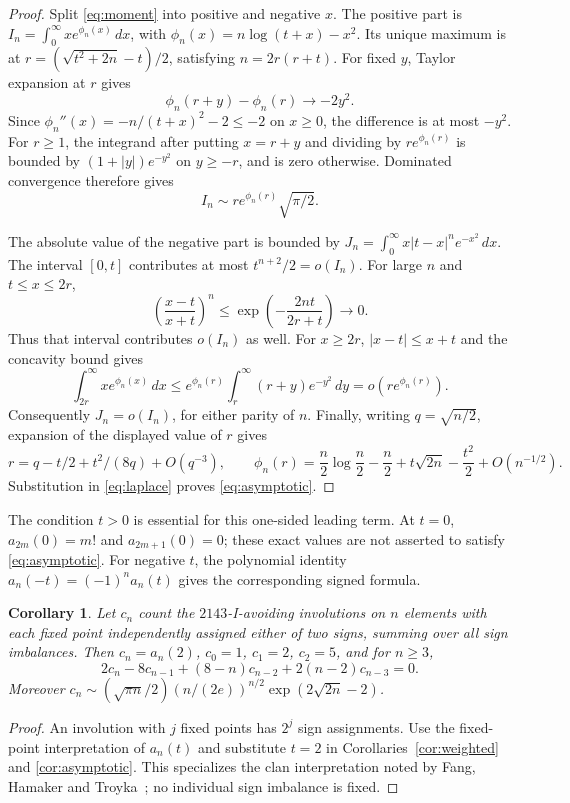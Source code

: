 \documentclass[11pt]{article}
\newtheorem{corollary}[theorem]{Corollary}
\begin{document}
\begin{proof}
Split \eqref{eq:moment} into positive and negative $x$.
The positive part is
$I_n=\int_0^\infty x e^{\phi_n(x)}\,dx$, with
$\phi_n(x)=n\log(t+x)-x^2$.
Its unique maximum is at
$r=(\sqrt{t^2+2n}-t)/2$, satisfying $n=2r(r+t)$.
For fixed $y$, Taylor expansion at $r$ gives
\[
 \phi_n(r+y)-\phi_n(r)\longrightarrow-2y^2.
\]
Since $\phi_n''(x)=-n/(t+x)^2-2\leq-2$ on $x\geq0$,
the difference is at most $-y^2$. For $r\geq1$, the integrand after
putting $x=r+y$ and dividing by $r e^{\phi_n(r)}$ is bounded by
$(1+|y|)e^{-y^2}$ on $y\geq-r$, and is zero otherwise.
Dominated convergence therefore gives
\begin{equation}\label{eq:laplace}
 I_n\sim r e^{\phi_n(r)}\sqrt{\pi/2}.
\end{equation}

The absolute value of the negative part is bounded by
$J_n=\int_0^\infty x|t-x|^ne^{-x^2}\,dx$.
The interval $[0,t]$ contributes at most $t^{n+2}/2=o(I_n)$.
For large $n$ and $t\leq x\leq2r$,
\[
 \left(\frac{x-t}{x+t}\right)^n
 \leq\exp\left(-\frac{2nt}{2r+t}\right)\longrightarrow0.
\]
Thus that interval contributes $o(I_n)$ as well.
For $x\geq2r$, $|x-t|\leq x+t$ and the concavity bound gives
\[
 \int_{2r}^\infty x e^{\phi_n(x)}\,dx
 \leq e^{\phi_n(r)}\int_r^\infty(r+y)e^{-y^2}\,dy
 =o(r e^{\phi_n(r)}).
\]
Consequently $J_n=o(I_n)$, for either parity of $n$.
Finally, writing $q=\sqrt{n/2}$, expansion of the displayed value of
$r$ gives
\[
 r=q-t/2+t^2/(8q)+O(q^{-3}),\qquad
 \phi_n(r)=\frac n2\log\frac n2-\frac n2
              +t\sqrt{2n}-\frac{t^2}{2}+O(n^{-1/2}).
\]
Substitution in \eqref{eq:laplace} proves \eqref{eq:asymptotic}.
\end{proof}

The condition $t>0$ is essential for this one-sided leading term.
At $t=0$, $a_{2m}(0)=m!$ and $a_{2m+1}(0)=0$; these exact values
are not asserted to satisfy \eqref{eq:asymptotic}.
For negative $t$, the polynomial identity
$a_n(-t)=(-1)^na_n(t)$ gives the corresponding signed formula.

\begin{corollary}\label{cor:clans}
Let $c_n$ count the $2143$-I-avoiding involutions on $n$ elements with
each fixed point independently assigned either of two signs, summing over
all sign imbalances. Then $c_n=a_n(2)$, $c_0=1$, $c_1=2$, $c_2=5$,
and for $n\geq3$,
\[
 2c_n-8c_{n-1}+(8-n)c_{n-2}+2(n-2)c_{n-3}=0.
\]
Moreover $c_n\sim(\sqrt{\pi n}/2)(n/(2e))^{n/2}
\exp(2\sqrt{2n}-2)$.
\end{corollary}
\begin{proof}
An involution with $j$ fixed points has $2^j$ sign assignments.
Use the fixed-point interpretation of $a_n(t)$ and substitute $t=2$
in Corollaries~\ref{cor:weighted} and \ref{cor:asymptotic}.
This specializes the clan interpretation noted by Fang, Hamaker and
Troyka~\cite[Section 5.1]{fang}; no individual sign imbalance is fixed.
\end{proof}
\end{document}
